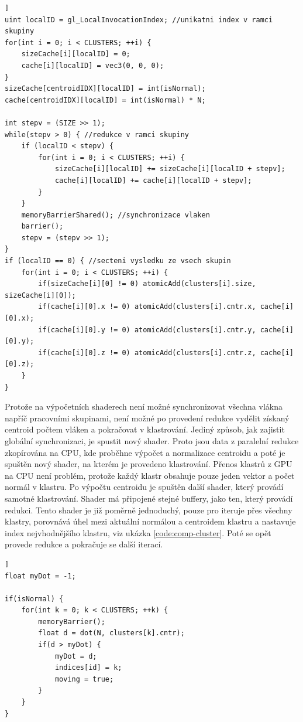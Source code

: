 \documentclass[11pt,twoside,a4paper]{book}
\begin{document}
\begin{lstlisting}[caption={Paralelní redukce na výpočetních shaderech.},firstnumber=1,label={code:comp-reduction},float=[ht]]
uint localID = gl_LocalInvocationIndex; //unikatni index v ramci skupiny
for(int i = 0; i < CLUSTERS; ++i) {
	sizeCache[i][localID] = 0;
	cache[i][localID] = vec3(0, 0, 0);
}
sizeCache[centroidIDX][localID] = int(isNormal);
cache[centroidIDX][localID] = int(isNormal) * N;

int stepv = (SIZE >> 1); 
while(stepv > 0) { //redukce v ramci skupiny
	if (localID < stepv) {
		for(int i = 0; i < CLUSTERS; ++i) {
			sizeCache[i][localID] += sizeCache[i][localID + stepv];
			cache[i][localID] += cache[i][localID + stepv];
		}
	}
	memoryBarrierShared(); //synchronizace vlaken
	barrier();
	stepv = (stepv >> 1);
}
if (localID == 0) { //secteni vysledku ze vsech skupin
	for(int i = 0; i < CLUSTERS; ++i) {
		if(sizeCache[i][0] != 0) atomicAdd(clusters[i].size, sizeCache[i][0]);
		if(cache[i][0].x != 0) atomicAdd(clusters[i].cntr.x, cache[i][0].x);
		if(cache[i][0].y != 0) atomicAdd(clusters[i].cntr.y, cache[i][0].y);
		if(cache[i][0].z != 0) atomicAdd(clusters[i].cntr.z, cache[i][0].z);
	}
}
\end{lstlisting}


Protože na výpočetních shaderech není možné synchronizovat všechna vlákna napříč pracovními skupinami, není možné po provedení redukce vydělit získaný centroid počtem vláken a pokračovat v klastrování. Jediný způsob, jak zajistit globální synchronizaci, je spustit nový shader. Proto jsou data z paralelní redukce zkopírována na CPU, kde proběhne výpočet a normalizace centroidu a poté je spuštěn nový shader, na kterém je provedeno klastrování. Přenos klastrů z GPU na CPU není problém, protože každý klastr obsahuje pouze jeden vektor a počet normál v klastru. Po výpočtu centroidu je spuštěn další shader, který provádí samotné klastrování. Shader má připojené stejné buffery, jako ten, který provádí redukci. Tento shader je již poměrně jednoduchý, pouze pro iteruje přes všechny klastry, porovnává úhel mezi aktuální normálou a centroidem klastru a nastavuje index nejvhodnějšího klastru, viz ukázka \ref{code:comp-cluster}. Poté se opět provede redukce a pokračuje se další iterací.

\begin{lstlisting}[caption={K-means klastrování na výpočetních shaderech.},firstnumber=1,label={code:comp-cluster},float=[ht]]
float myDot = -1;

if(isNormal) {
	for(int k = 0; k < CLUSTERS; ++k) {
		memoryBarrier();
		float d = dot(N, clusters[k].cntr);
		if(d > myDot) {
			myDot = d;
			indices[id] = k;
			moving = true;
		}
	}
}
\end{lstlisting}
\end{document}
